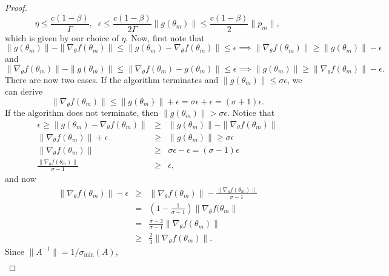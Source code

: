 \begin{proof}
\begin{equation}
    \eta \leq \frac{c(1-\beta)}{\Gamma}, \;\; \epsilon \leq \frac{c(1-\beta)}{2\Gamma}\|g(\theta_m)\| \leq \frac{c(1-\beta)}{2}\|p_m\|,
\end{equation}
which is given by our choice of $\eta$.
Now, first note that
\begin{equation}
\|g(\theta_m)\| - \|\nabla_\theta f(\theta_m)\| \leq \|g(\theta_m) - \nabla_\theta f(\theta_m)\| \leq \epsilon \implies \|\nabla_\theta f(\theta_m)\| \geq \|g(\theta_m)\| - \epsilon
\end{equation} 
and
\begin{equation}
\|\nabla_\theta f(\theta_m)\|-\|g(\theta_m)\| \leq \|\nabla_\theta f(\theta_m)-g(\theta_m)\| \leq \epsilon \implies \|g(\theta_m)\| \geq \|\nabla_\theta f(\theta_m)\| - \epsilon.
\end{equation}
There are now two cases. 
If the algorithm terminates and $\|g(\theta_m)\| \leq \sigma \epsilon$, we can derive 
\begin{equation}
    \|\nabla_\theta f(\theta_m)\| \leq \|g(\theta_m)\| + \epsilon = \sigma\epsilon+\epsilon = (\sigma+1)\epsilon.
\end{equation}
If the algorithm does not terminate, then $\|g(\theta_m)\| > \sigma \epsilon$. 
Notice that 
\begin{eqnarray}
    \epsilon \geq \|g(\theta_m) - \nabla_\theta f(\theta_m)\| &\geq& \|g(\theta_m)\| - \|\nabla_\theta f(\theta_m)\| 
    \\
    \|\nabla_\theta f(\theta_m)\| + \epsilon &\geq& \|g(\theta_m)\| \geq \sigma \epsilon 
    \\
    \|\nabla_\theta f(\theta_m)\| &\geq& \sigma \epsilon - \epsilon = (\sigma - 1)\epsilon 
    \\
    \frac{\|\nabla_\theta f(\theta_m)\|}{\sigma-1} &\geq& \epsilon,
\end{eqnarray}
and now 
\begin{eqnarray}
    \|\nabla_\theta f(\theta_m)\| - \epsilon
    &\geq&  \|\nabla_\theta f(\theta_m)\| - \frac{\|\nabla_\theta f(\theta_m)\|}{\sigma-1} 
    \\
    &=& \left(1-\frac{1}{\sigma-1}\right)\|\nabla_\theta f(\theta_m\| 
    \\
    &=& \frac{\sigma-2}{\sigma-1}\|\nabla_\theta f(\theta_m)\| 
    \\
    &\geq& \frac{2}{3}\|\nabla_\theta f(\theta_m)\|.
\end{eqnarray}
Since $\|A^{-1}\| = 1/\sigma_{\min}(A)$,
\begin{align}

\end{align}
\end{proof}
